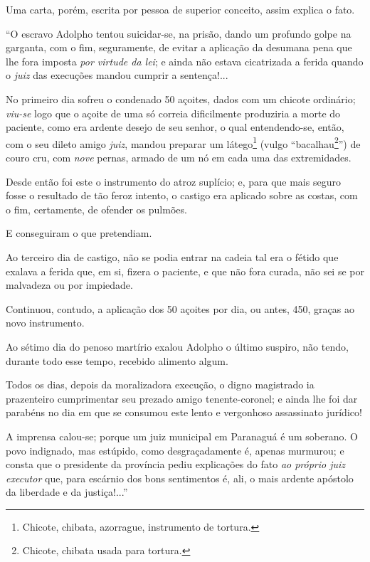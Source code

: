 Uma carta, porém, escrita por pessoa de superior conceito, assim explica
o fato.

``O escravo Adolpho tentou suicidar-se, na prisão, dando um profundo
golpe na garganta, com o fim, seguramente, de evitar a aplicação da
desumana pena que lhe fora imposta \emph{por virtude da lei}; e ainda
não estava cicatrizada a ferida quando o \emph{juiz} das execuções
mandou cumprir a sentença!...

No primeiro dia sofreu o condenado 50 açoites, dados com um chicote
ordinário; \emph{viu-se} logo que o açoite de uma só correia
dificilmente produziria a morte do paciente, como era ardente desejo de
seu senhor, o qual entendendo-se, então, com o seu dileto amigo
\emph{juiz}, mandou preparar um látego\footnote{Chicote, chibata,
  azorrague, instrumento de tortura.} (vulgo ``bacalhau\footnote{
  Chicote, chibata usada para tortura.}'') de couro cru, com \emph{nove}
pernas, armado de um nó em cada uma das extremidades.

Desde então foi este o instrumento do atroz suplício; e, para que mais
seguro fosse o resultado de tão feroz intento, o castigo era aplicado
sobre as costas, com o fim, certamente, de ofender os pulmões.

E conseguiram o que pretendiam.

Ao terceiro dia de castigo, não se podia entrar na cadeia tal era o
fétido que exalava a ferida que, em si, fizera o paciente, e que não
fora curada, não sei se por malvadeza ou por impiedade.

Continuou, contudo, a aplicação dos 50 açoites por dia, ou antes, 450,
graças ao novo instrumento.

Ao sétimo dia do penoso martírio exalou Adolpho o último suspiro, não
tendo, durante todo esse tempo, recebido alimento algum.

\noindent\dotfill

Todos os dias, depois da moralizadora execução, o digno magistrado ia
prazenteiro cumprimentar seu prezado amigo tenente-coronel; e ainda lhe
foi dar parabéns no dia em que se consumou este lento e vergonhoso
assassinato jurídico!

\noindent\dotfill

A imprensa calou-se; porque um juiz municipal em Paranaguá é um
soberano. O povo indignado, mas estúpido, como desgraçadamente é, apenas
murmurou; e consta que o presidente da província pediu explicações do
fato \emph{ao próprio juiz executor} que, para escárnio dos bons
sentimentos é, ali, o mais ardente apóstolo da liberdade e da
justiça!...''

